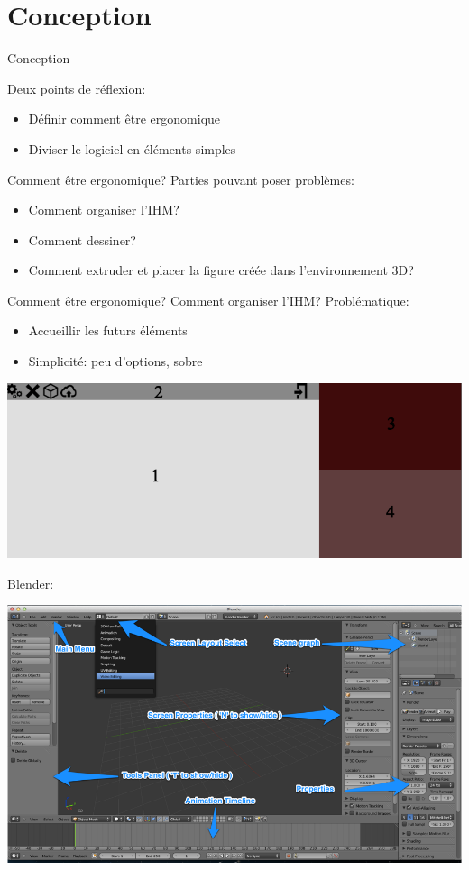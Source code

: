 \documentclass[a4paper,10pt]{beamer}
\begin{document}
	
	\section{Conception}	
		\begin{frame}{Conception}
		
		Deux points de réflexion:
			\begin{itemize}
				  \item Définir comment être ergonomique
				  \item Diviser le logiciel en éléments simples
			\end{itemize}
		\end{frame}
		
		
		\begin{frame}{Comment être ergonomique?}
				Parties pouvant poser problèmes:
				
				\begin{itemize}
					\item Comment organiser l'IHM?
					\item Comment dessiner?
					\item Comment extruder et placer la figure créée dans l'environnement 3D?
				\end{itemize}
		\end{frame}	
		
			
			\begin{frame}{Comment être ergonomique?}
				Comment organiser l'IHM?
				Problématique:
				\begin{itemize}
					\item Accueillir les futurs éléments
					\item Simplicité: peu d'options, sobre
				\end{itemize}

				\centerline{\includegraphics[scale=0.3]{images/Nono/img6.png}}
			Blender:
				\centerline{\includegraphics[scale=0.2]{images/Nono/img5.png}} 
			\end{frame}
		
\end{document}
